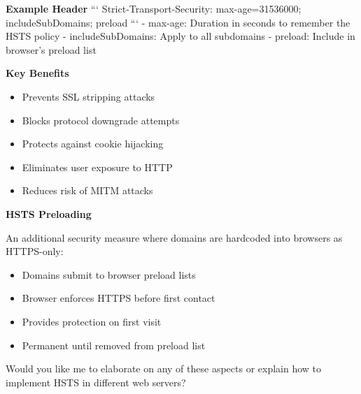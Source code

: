 \textbf{Example Header}
```
Strict-Transport-Security: max-age=31536000; includeSubDomains; preload
```
- max-age: Duration in seconds to remember the HSTS policy
- includeSubDomains: Apply to all subdomains
- preload: Include in browser's preload list

\textbf{Key Benefits}
\begin{itemize}
    \item Prevents SSL stripping attacks
    \item Blocks protocol downgrade attempts
    \item Protects against cookie hijacking
    \item Eliminates user exposure to HTTP
    \item Reduces risk of MITM attacks
\end{itemize}

\textbf{HSTS Preloading}

An additional security measure where domains are hardcoded into browsers as HTTPS-only:
\begin{itemize}
    \item Domains submit to browser preload lists
    \item Browser enforces HTTPS before first contact
    \item Provides protection on first visit
    \item Permanent until removed from preload list
\end{itemize}

Would you like me to elaborate on any of these aspects or explain how to implement HSTS in different web servers?